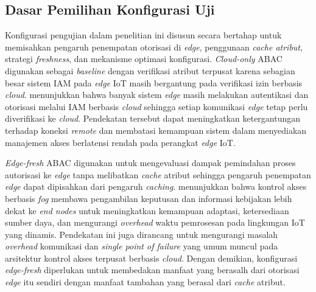 \subsection{Dasar Pemilihan Konfigurasi Uji}

Konfigurasi pengujian dalam penelitian ini disusun secara bertahap untuk memisahkan pengaruh penempatan otorisasi di \textit{edge}, penggunaan \textit{cache atribut}, strategi \textit{freshness}, dan mekanisme optimasi konfigurasi. \textit{Cloud-only} ABAC digunakan sebagai \textit{baseline} dengan verifikasi atribut terpusat karena sebagian besar sistem IAM pada \textit{edge} IoT masih bergantung pada verifikasi izin berbasis \textit{cloud}. \textcite{wang_edge-enabled_2025} menunjukkan bahwa banyak sistem \textit{edge} masih melakukan autentikasi dan otorisasi melalui IAM berbasis \textit{cloud} sehingga setiap komunikasi \textit{edge} tetap perlu diverifikasi ke \textit{cloud}. Pendekatan tersebut dapat meningkatkan ketergantungan terhadap koneksi \textit{remote} dan membatasi kemampuan sistem dalam menyediakan manajemen akses berlatensi rendah pada perangkat \textit{edge} IoT.

\textit{Edge-fresh} ABAC digunakan untuk mengevaluasi dampak pemindahan proses autorisasi ke \textit{edge} tanpa melibatkan \textit{cache} atribut sehingga pengaruh penempatan \textit{edge} dapat dipisahkan dari pengaruh \textit{caching}. \textcite{kalaria_adaptive_2024} menunjukkan bahwa kontrol akses berbasis \textit{fog} membawa pengambilan keputusan dan informasi kebijakan lebih dekat ke \textit{end nodes} untuk meningkatkan kemampuan adaptasi, ketersediaan sumber daya, dan mengurangi \textit{overhead} waktu pemrosesan pada lingkungan IoT yang dinamis. Pendekatan ini juga dirancang untuk mengurangi masalah \textit{overhead} komunikasi dan \textit{single point of failure} yang umum muncul pada arsitektur kontrol akses terpusat berbasis \textit{cloud}. Dengan demikian, konfigurasi \textit{edge-fresh} diperlukan untuk membedakan manfaat yang berasalh dari otorisasi \textit{edge} itu sendiri dengan manfaat tambahan yang berasal dari \textit{cache} atribut.

